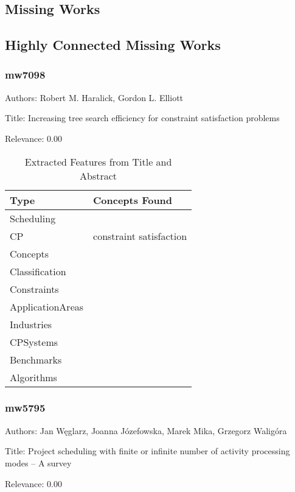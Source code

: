 \subsection{Missing Works}

\subsection{Highly Connected Missing Works}

\subsubsection{mw7098}
\label{mw:mw7098}

Authors: Robert M. Haralick, Gordon L. Elliott

Title: Increasing tree search efficiency for constraint satisfaction problems

Relevance:  0.00

{\scriptsize
\begin{longtable}{p{2cm}p{20cm}}
\caption{Extracted Features from Title and Abstract}\\ \toprule
Type & Concepts Found\\ \midrule
\endhead
\bottomrule
\endfoot
Scheduling & \\ 
CP & constraint satisfaction\\ 
Concepts & \\ 
Classification & \\ 
Constraints & \\ 
ApplicationAreas & \\ 
Industries & \\ 
CPSystems & \\ 
Benchmarks & \\ 
Algorithms & \\ 
\end{longtable}
}



\subsubsection{mw5795}
\label{mw:mw5795}

Authors: Jan Węglarz, Joanna Józefowska, Marek Mika, Grzegorz Waligóra

Title: Project scheduling with finite or infinite number of activity processing modes – A survey

Relevance:  0.00

